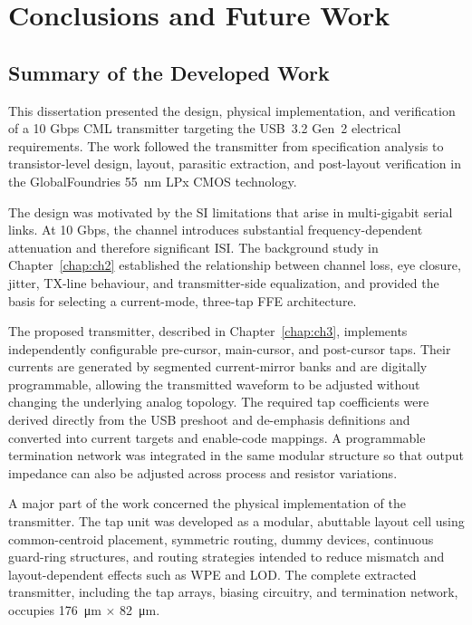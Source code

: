 \chapter{Conclusions and Future Work} \label{chap:ch5}

\section{Summary of the Developed Work}

This dissertation presented the design, physical implementation, and verification of a 10 Gbps \ac{CML} transmitter targeting the \ac{USB}~3.2 Gen~2 electrical requirements. The work followed the transmitter from specification analysis to transistor-level design, layout, parasitic extraction, and post-layout verification in the GlobalFoundries \SI{55}{\nano\meter} LPx \ac{CMOS} technology.

The design was motivated by the \ac{SI} limitations that arise in multi-gigabit serial links. At 10 Gbps, the channel introduces substantial frequency-dependent attenuation and therefore significant \ac{ISI}. The background study in Chapter~\ref{chap:ch2} established the relationship between channel loss, eye closure, jitter, \ac{TX}-line behaviour, and transmitter-side equalization, and provided the basis for selecting a current-mode, three-tap \ac{FFE} architecture.

The proposed transmitter, described in Chapter~\ref{chap:ch3}, implements independently configurable pre-cursor, main-cursor, and post-cursor taps. Their currents are generated by segmented current-mirror banks and are digitally programmable, allowing the transmitted waveform to be adjusted without changing the underlying analog topology. The required tap coefficients were derived directly from the \ac{USB} preshoot and de-emphasis definitions and converted into current targets and enable-code mappings. A programmable termination network was integrated in the same modular structure so that output impedance can also be adjusted across process and resistor variations.

A major part of the work concerned the physical implementation of the transmitter. The tap unit was developed as a modular, abuttable layout cell using common-centroid placement, symmetric routing, dummy devices, continuous guard-ring structures, and routing strategies intended to reduce mismatch and layout-dependent effects such as \ac{WPE} and \ac{LOD}. The complete extracted transmitter, including the tap arrays, biasing circuitry, and termination network, occupies \SI{176}{\micro\meter} $\times$ \SI{82}{\micro\meter}.

